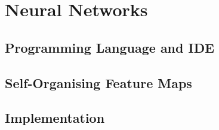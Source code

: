 
\chapter{Neural Networks} 
\section{Programming Language and IDE}
\section{Self-Organising Feature Maps}
\section{Implementation}